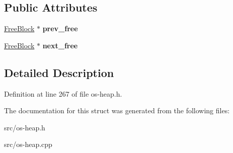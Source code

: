 \subsection*{Public Attributes}
\begin{DoxyCompactItemize}
\item 
\hyperlink{struct_object_script_1_1_o_s_heap_manager_1_1_free_block}{Free\+Block} $\ast$ {\bfseries prev\+\_\+free}\hypertarget{struct_object_script_1_1_o_s_heap_manager_1_1_free_block_a1d972fdd159d7b61999e9a415ea0820c}{}\label{struct_object_script_1_1_o_s_heap_manager_1_1_free_block_a1d972fdd159d7b61999e9a415ea0820c}

\item 
\hyperlink{struct_object_script_1_1_o_s_heap_manager_1_1_free_block}{Free\+Block} $\ast$ {\bfseries next\+\_\+free}\hypertarget{struct_object_script_1_1_o_s_heap_manager_1_1_free_block_acd376f1243f42eb693618f2a7bf33d7e}{}\label{struct_object_script_1_1_o_s_heap_manager_1_1_free_block_acd376f1243f42eb693618f2a7bf33d7e}

\end{DoxyCompactItemize}


\subsection{Detailed Description}


Definition at line 267 of file os-\/heap.\+h.



The documentation for this struct was generated from the following files\+:\begin{DoxyCompactItemize}
\item 
src/os-\/heap.\+h\item 
src/os-\/heap.\+cpp\end{DoxyCompactItemize}
